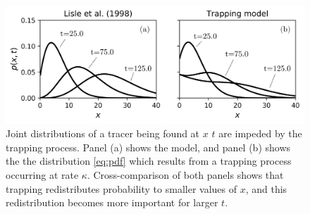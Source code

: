 \documentclass[]{agujournal2018}
\begin{document}
\begin{figure}
	\includegraphics[width=\linewidth,keepaspectratio]{./figures/pdf-plot-edit.png}
	\caption{Joint distributions of a tracer being found at $x$ $t$ are impeded by the trapping process. Panel (a) shows the \citet{Lisle1998} model, and panel (b) shows the the distribution \ref{eq:pdf} which results from a trapping process occurring at rate $\kappa$. Cross-comparison of both panels shows that trapping redistributes probability to smaller values of $x$, and this redistribution becomes more important for larger $t$.}
	\label{fig:pdfs}
\end{figure}


\end{document}
